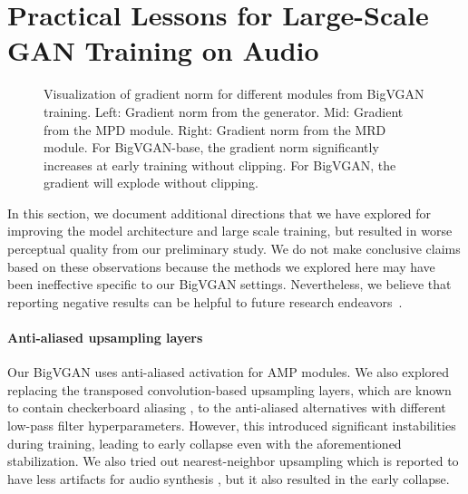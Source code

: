 \documentclass{article} \usepackage{iclr2023_conference,times}
\theoremstyle{plain}
\theoremstyle{definition}
\theoremstyle{remark}
\begin{document}
\section{Practical Lessons for Large-Scale GAN Training on Audio}
\label{appendix:practical}

\begin{figure}[h]
\centering
{}
\hspace{0.22cm}
\hspace{0.22cm}
\vspace*{-1em}
\caption{\footnotesize 
Visualization of gradient norm for different modules from BigVGAN training. Left: Gradient norm from the generator. Mid: Gradient from the MPD module. Right: Gradient norm from the MRD module.
For BigVGAN-base, the gradient norm significantly increases at early training without clipping.
For BigVGAN, the gradient will explode without clipping. }
\label{fig_grad_norm}
\end{figure}



In this section, we document additional directions that we have explored for improving the model architecture and large scale training, but resulted in worse perceptual quality from our preliminary study. We do not make conclusive claims based on these observations because the methods we explored here may have been ineffective specific to our BigVGAN settings. Nevertheless, we believe that reporting negative results can be helpful to future research endeavors~\citep{brock2018large}.
\paragraph{Anti-aliased upsampling layers} Our BigVGAN uses anti-aliased activation for AMP modules. We also explored replacing the transposed convolution-based upsampling layers, which are known to contain checkerboard aliasing \citep{odena2016deconvolution}, to the anti-aliased alternatives with different low-pass filter hyperparameters. However, this introduced significant instabilities during training, leading to early collapse even with the aforementioned stabilization. We also tried out nearest-neighbor upsampling which is reported to have less artifacts for audio synthesis \citep{pons2021upsampling}, but it also resulted in the early collapse.
\end{document}
